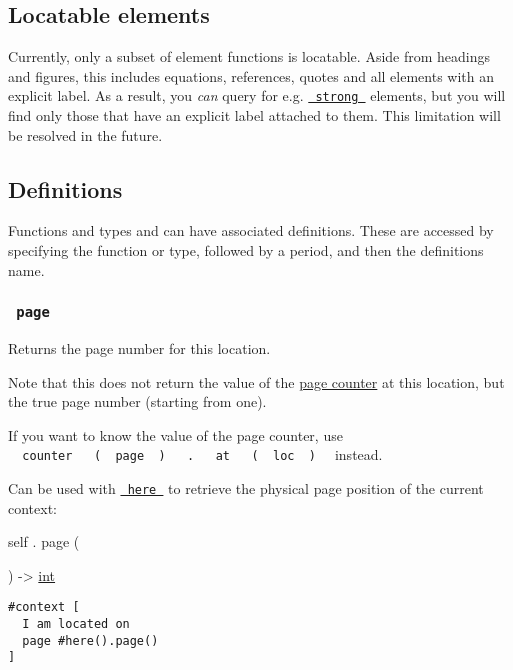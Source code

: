 \subsection{Locatable elements}\label{locatable}

Currently, only a subset of element functions is locatable. Aside from
headings and figures, this includes equations, references, quotes and
all elements with an explicit label. As a result, you \emph{can} query
for e.g. \href{/docs/reference/model/strong/}{\texttt{\ strong\ }}
elements, but you will find only those that have an explicit label
attached to them. This limitation will be resolved in the future.

\subsection{\texorpdfstring{{ Definitions
}}{ Definitions }}\label{definitions}

\label{definitions-tooltip}
Functions and types and can have associated definitions. These are
accessed by specifying the function or type, followed by a period, and
then the definition\textquotesingle s name.

\subsubsection{\texorpdfstring{\texttt{\ page\ }}{ page }}\label{definitions-page}

Returns the page number for this location.

Note that this does not return the value of the
\href{/docs/reference/introspection/counter/}{page counter} at this
location, but the true page number (starting from one).

If you want to know the value of the page counter, use
\texttt{\ }{\texttt{\ counter\ }}\texttt{\ }{\texttt{\ (\ }}\texttt{\ page\ }{\texttt{\ )\ }}\texttt{\ }{\texttt{\ .\ }}\texttt{\ }{\texttt{\ at\ }}\texttt{\ }{\texttt{\ (\ }}\texttt{\ loc\ }{\texttt{\ )\ }}\texttt{\ }
instead.

Can be used with
\href{/docs/reference/introspection/here/}{\texttt{\ here\ }} to
retrieve the physical page position of the current context:

self { . } { page } (

) -\textgreater{} \href{/docs/reference/foundations/int/}{int}

\begin{verbatim}
#context [
  I am located on
  page #here().page()
]
\end{verbatim}

